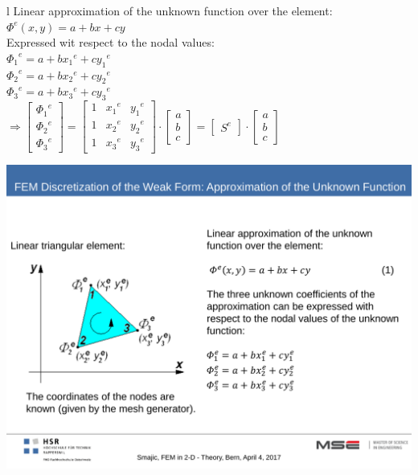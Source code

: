 \begin{minipage}[rt]{12cm}
	\begin{tabular}{l}
		Linear approximation of the unknown function over the element: \\
		\(\displaystyle \Phi^e(x,y) = a + bx + cy \) \\
		Expressed wit respect to the nodal values: \\
		\(\displaystyle {\Phi_1}^e = a + b{x_1}^e + c{y_1}^e \) \\
		\(\displaystyle {\Phi_2}^e = a + b{x_2}^e + c{y_2}^e \) \\
		\(\displaystyle {\Phi_3}^e = a + b{x_3}^e + c{y_3}^e \) \\
		\(\displaystyle \Rightarrow 
			\begin{bmatrix}
				{\Phi_1}^e \\
				{\Phi_2}^e \\
				{\Phi_3}^e
			\end{bmatrix} 
			=
			\begin{bmatrix}
				1 & {x_1}^e & {y_1}^e \\
				1 & {x_2}^e & {y_2}^e \\
				1 & {x_3}^e & {y_3}^e 
			\end{bmatrix}
			\cdot
			\begin{bmatrix}
				a \\
				b \\
				c
			\end{bmatrix}
			= 
			\begin{bmatrix}
				S^e 
			\end{bmatrix}
			\cdot 
			\begin{bmatrix}
				a \\
				b \\
				c
			\end{bmatrix} \) \\
	\end{tabular}
\end{minipage}
\begin{minipage}[lt]{8cm}
	\includegraphics[width=.8\textwidth]{./images/nodes.pdf}\\
\end{minipage}

